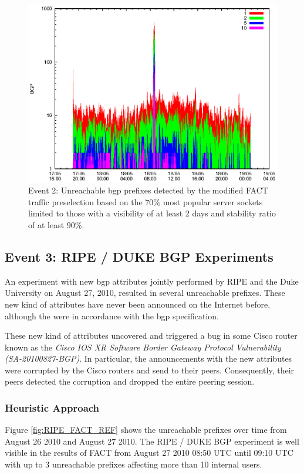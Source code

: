 \begin{figure}
	[p] \centering 
	\includegraphics[width=0.75\linewidth]{images/events/2010_05_18/bgp_log_Set_var_0_1_stab_9_vts_2.eps} \caption{Event 2: Unreachable \gls{bgp} prefixes detected by the modified \gls{FACT} traffic preselection based on the $70\%$ most popular \glspl{server socket} limited to those with a visibility of at least 2 days and stability ratio of at least $90\%$.} 
	\label{fig:TIER1_FACT_popularVTS2STAB9} 
\end{figure}

\newpage 
\subsection{Event 3: RIPE / DUKE BGP Experiments}

An experiment with new \gls{bgp} attributes jointly performed by RIPE and the Duke University on August 27, 2010, resulted in several unreachable prefixes\citep{SchatzmannPAM2011}. 
These new kind of attributes have never been announced on the Internet before, although the were in accordance with the \gls{bgp} specification\citep{ripe_duke}.

These new kind of attributes uncovered and triggered a bug in some Cisco router known as the \emph{Cisco IOS XR Software Border Gateway Protocol Vulnerability (SA-20100827-BGP)}\citep{cisco_vulnerability}. 
In particular, the announcements with the new attributes were corrupted by the Cisco routers and send to their peers. 
Consequently, their peers detected the corruption and dropped the entire peering session\citep{ripe_duke}.

\subsubsection{Heuristic Approach} Figure \ref{fig:RIPE_FACT_REF} shows the unreachable prefixes over time from August 26 2010 and August 27 2010. 
The RIPE / DUKE BGP experiment is well visible in the results of \gls{FACT} from August 27 2010 08:50 UTC until 09:10 UTC with up to 3 unreachable prefixes affecting more than 10 internal users. 

